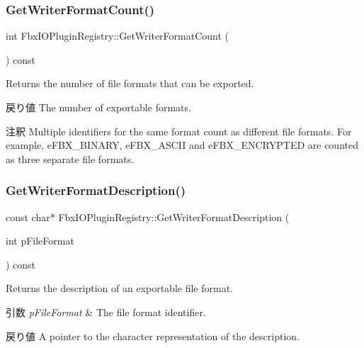 \subsubsection{\texorpdfstring{Get\+Writer\+Format\+Count()}{GetWriterFormatCount()}}
{\footnotesize\ttfamily int Fbx\+I\+O\+Plugin\+Registry\+::\+Get\+Writer\+Format\+Count (\begin{DoxyParamCaption}{ }\end{DoxyParamCaption}) const}

Returns the number of file formats that can be exported. \begin{DoxyReturn}{戻り値}
The number of exportable formats. 
\end{DoxyReturn}
\begin{DoxyRemark}{注釈}
Multiple identifiers for the same format count as different file formats. For example, e\+F\+B\+X\+\_\+\+B\+I\+N\+A\+RY, e\+F\+B\+X\+\_\+\+A\+S\+C\+II and e\+F\+B\+X\+\_\+\+E\+N\+C\+R\+Y\+P\+T\+ED are counted as three separate file formats. 
\end{DoxyRemark}
\mbox{\label{class_fbx_i_o_plugin_registry_ae9b071a85a7f1738b813357b07618747}} 
\subsubsection{\texorpdfstring{Get\+Writer\+Format\+Description()}{GetWriterFormatDescription()}}
{\footnotesize\ttfamily const char$\ast$ Fbx\+I\+O\+Plugin\+Registry\+::\+Get\+Writer\+Format\+Description (\begin{DoxyParamCaption}\item[{int}]{p\+File\+Format }\end{DoxyParamCaption}) const}

Returns the description of an exportable file format. 
\begin{DoxyParams}{引数}
{\em p\+File\+Format} & The file format identifier. \\
\hline
\end{DoxyParams}
\begin{DoxyReturn}{戻り値}
A pointer to the character representation of the description. 
\end{DoxyReturn}
\mbox{\label{class_fbx_i_o_plugin_registry_abe5b3d6fef71707f13e4a1ded04a2285}} 
